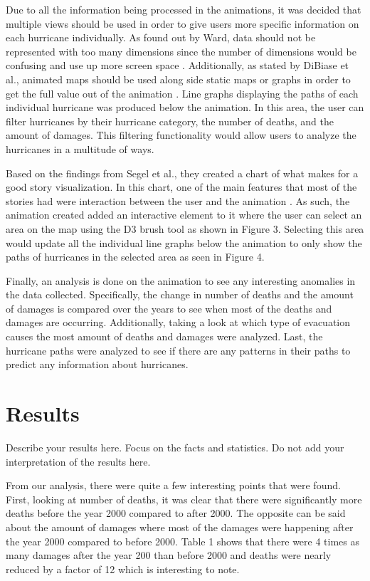 Due to all the information being processed in the animations, it was decided that multiple views should be used in order to give users more specific information on each hurricane individually. As found out by Ward, data should not be represented with too many dimensions since the number of dimensions would be confusing and use up more screen space \cite{ward1994xmdvtool}. Additionally, as stated by DiBiase et al., animated maps should be used along side static maps or graphs in order to get the full value out of the animation \cite{dibiase1992animation}.  Line graphs displaying the paths of each individual hurricane was produced below the animation. In this area, the user can filter hurricanes by their hurricane category, the number of deaths, and the amount of damages. This filtering functionality would allow users to analyze the hurricanes in a multitude of ways. 

Based on the findings from Segel et al., they created a chart of what makes for a good story visualization. In this chart, one of the main features that most of the stories had were interaction between the user and the animation \cite{segel2010narrative}. As such, the animation created added an interactive element to it where the user can select an area on the map using the D3 brush tool as shown in Figure 3. Selecting this area would update all the individual line graphs below the animation to only show the paths of hurricanes in the selected area as seen in Figure 4. 

\brush
\multipleViews

Finally, an analysis is done on the animation to see any interesting anomalies in the data collected. Specifically, the change in number of deaths and the amount of damages is compared over the years to see when most of the deaths and damages are occurring. Additionally, taking a look at which type of evacuation causes the most amount of deaths and damages were analyzed. Last, the hurricane paths were analyzed to see if there are any patterns in their paths to predict any information about hurricanes. 

\section{Results}
Describe your results here. Focus on the facts and statistics. Do not add your interpretation of the results here.

From our analysis, there were quite a few interesting points that were found. First, looking at number of deaths, it was clear that there were significantly more deaths before the year 2000 compared to after 2000. The opposite can be said about the amount of damages where most of the damages were happening after the year 2000 compared to before 2000. Table 1 shows that there were 4 times as many damages after the year 200 than before 2000 and deaths were nearly reduced by a factor of 12 which is interesting to note.

